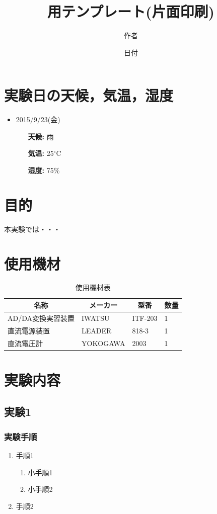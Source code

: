 \documentclass[10.5pt]{jsarticle}
\title{\LaTeXe 用テンプレート(片面印刷)}
\date{日付}
\author{作者}
\begin{document}
\maketitle
\thispagestyle{fancy}

\section{実験日の天候，気温，湿度}
\begin{itemize}
	\item{2015/9/23(金)}
		\begin{itemize}
			\item[\textbf{天候:}]{雨}
			\item[\textbf{気温:}]{25$^\circ$C}
			\item[\textbf{湿度:}]{75\%}
		\end{itemize}
\end{itemize}

\section{目的}
本実験では・・・

\section{使用機材}
\begin{table}[H]
	\centering
	\caption{使用機材表} \label{Equipments}
	\begin{tabular}{|l|l|l|l|} 
		\hline
		\multicolumn{1}{|c|}{\textbf{名称}}&\multicolumn{1}{c|}{\textbf{メーカー}}&\multicolumn{1}{c|}{\textbf{型番}}&\multicolumn{1}{c|}{\textbf{数量}}\\\hline\hline
		AD/DA変換実習装置&IWATSU&ITF-203&1\\\hline
		直流電源装置&LEADER&818-3&1\\\hline
		直流電圧計&YOKOGAWA&2003&1\\\hline
	\end{tabular}
\end{table}

\newpage

\section{実験内容}
\subsection{実験1}
\subsubsection{実験手順}
\begin{enumerate}
\item{手順1}
	\begin{enumerate}
		\item{小手順1}
		\item{小手順2}
	\end{enumerate}
\item{手順2}
\end{enumerate}
\end{document}
